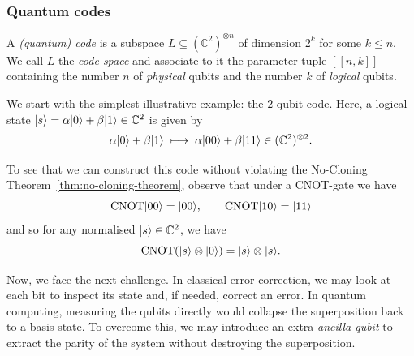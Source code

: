 \documentclass[a4paper, oneside, 12pt]{amsart}
\DeclareMathOperator{\CNOT}{CNOT}
\begin{document}
\subsubsection{Quantum codes}\label{sec:quantum-codes}

\begin{definition}\label{def:quantum-code}
  A \emph{(quantum) code} is a subspace \(L \subseteq (\mathbb{C}^{2})^{\otimes n}\) of dimension \(2^{k}\) for some \(k \leq n\).
  We call \(L\) the \emph{code space} and associate to it the parameter tuple \([[n,k]]\) containing the number \(n\) of \emph{physical} qubits and the number \(k\) of \emph{logical} qubits.
\end{definition}

We start with the simplest illustrative example: the \(2\)-qubit code.
Here, a logical state \(\lvert s\rangle = \alpha \lvert0\rangle + \beta \lvert1\rangle \in \mathbb{C}^{2}\) is given by
\begin{equation*}
  \alpha\lvert0\rangle + \beta\lvert1\rangle \;\longmapsto\; \alpha \lvert00\rangle + \beta \lvert11\rangle \in (\mathbb{C}^{2})^{\otimes 2}.
\end{equation*}

\begin{remark}\label{rmk:2-qubit-encoder}
  To see that we can construct this code without violating the No-Cloning Theorem~\ref{thm:no-cloning-theorem}, observe that under a CNOT-gate we have
  \begin{equation*}
    \CNOT\ket{00} = \ket{00}, \qquad
    \CNOT\ket{10} = \ket{11}
  \end{equation*}
  and so for any normalised \(\lvert s\rangle \in \mathbb{C}^{2}\), we have
  \begin{equation*}
    \CNOT(\ket{s} \otimes \ket{0}) = \ket{s} \otimes \ket{s}.
  \end{equation*}
\end{remark}

Now, we face the next challenge.
In classical error-correction, we may look at each bit to inspect its state and, if needed, correct an error.
In quantum computing, measuring the qubits directly would collapse the superposition back to a basis state.
To overcome this, we may introduce an extra \emph{ancilla qubit} to extract the parity of the system without destroying the superposition.
\end{document}
